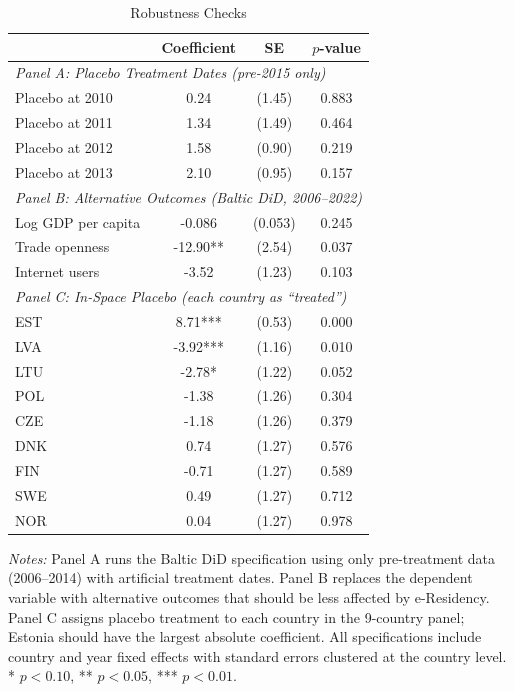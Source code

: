 \begin{table}[H]
\centering
\caption{Robustness Checks}
\label{tab:robust}
\begin{threeparttable}
\begin{tabular}{lccc}
\toprule
 & Coefficient & SE & $p$-value \\
\midrule
\multicolumn{4}{l}{\textit{Panel A: Placebo Treatment Dates (pre-2015 only)}} \\
Placebo at 2010 & 0.24 & (1.45) & 0.883 \\
Placebo at 2011 & 1.34 & (1.49) & 0.464 \\
Placebo at 2012 & 1.58 & (0.90) & 0.219 \\
Placebo at 2013 & 2.10 & (0.95) & 0.157 \\
\midrule
\multicolumn{4}{l}{\textit{Panel B: Alternative Outcomes (Baltic DiD, 2006--2022)}} \\
Log GDP per capita & -0.086 & (0.053) & 0.245 \\
Trade openness & -12.90** & (2.54) & 0.037 \\
Internet users & -3.52 & (1.23) & 0.103 \\
\midrule
\multicolumn{4}{l}{\textit{Panel C: In-Space Placebo (each country as ``treated'')}} \\
EST & 8.71*** & (0.53) & 0.000 \\
LVA & -3.92*** & (1.16) & 0.010 \\
LTU & -2.78* & (1.22) & 0.052 \\
POL & -1.38 & (1.26) & 0.304 \\
CZE & -1.18 & (1.26) & 0.379 \\
DNK & 0.74 & (1.27) & 0.576 \\
FIN & -0.71 & (1.27) & 0.589 \\
SWE & 0.49 & (1.27) & 0.712 \\
NOR & 0.04 & (1.27) & 0.978 \\
\bottomrule
\end{tabular}
\begin{tablenotes}[flushleft]\sloppy
\footnotesize
\item \textit{Notes:} Panel A runs the Baltic DiD specification using only pre-treatment data (2006--2014) with artificial treatment dates. Panel B replaces the dependent variable with alternative outcomes that should be less affected by e-Residency. Panel C assigns placebo treatment to each country in the 9-country panel; Estonia should have the largest absolute coefficient. All specifications include country and year fixed effects with standard errors clustered at the country level. * $p<0.10$, ** $p<0.05$, *** $p<0.01$.
\end{tablenotes}
\end{threeparttable}
\end{table}
